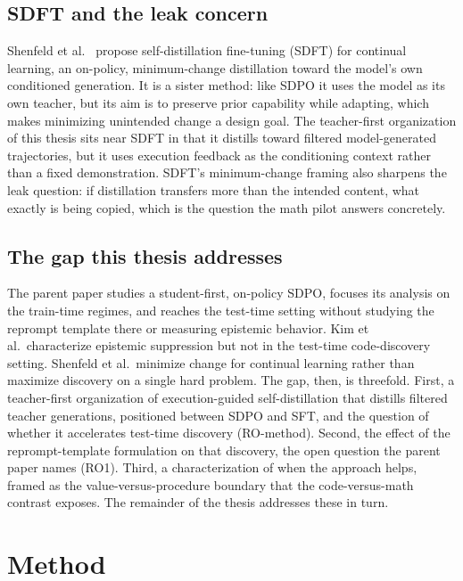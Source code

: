 \documentclass[12pt,a4paper]{report}
\begin{document}
\section{SDFT and the leak concern}\label{sdft-and-the-leak-concern}

Shenfeld et al.~\cite{r3} propose self-distillation fine-tuning (SDFT) for continual learning, an on-policy, minimum-change distillation toward the model's own conditioned generation. It is a sister method: like SDPO it uses the model as its own teacher, but its aim is to preserve prior capability while adapting, which makes minimizing unintended change a design goal. The teacher-first organization of this thesis sits near SDFT in that it distills toward filtered model-generated trajectories, but it uses execution feedback as the conditioning context rather than a fixed demonstration. SDFT's minimum-change framing also sharpens the leak question: if distillation transfers more than the intended content, what exactly is being copied, which is the question the math pilot answers concretely.

\section{The gap this thesis addresses}\label{the-gap-this-thesis-addresses}

The parent paper studies a student-first, on-policy SDPO, focuses its analysis on the train-time regimes, and reaches the test-time setting without studying the reprompt template there or measuring epistemic behavior. Kim et al.~characterize epistemic suppression but not in the test-time code-discovery setting. Shenfeld et al.~minimize change for continual learning rather than maximize discovery on a single hard problem. The gap, then, is threefold. First, a teacher-first organization of execution-guided self-distillation that distills filtered teacher generations, positioned between SDPO and SFT, and the question of whether it accelerates test-time discovery (RO-method). Second, the effect of the reprompt-template formulation on that discovery, the open question the parent paper names (RO1). Third, a characterization of when the approach helps, framed as the value-versus-procedure boundary that the code-versus-math contrast exposes. The remainder of the thesis addresses these in turn.

\chapter{Method}\label{chapter-3-method}
\end{document}
